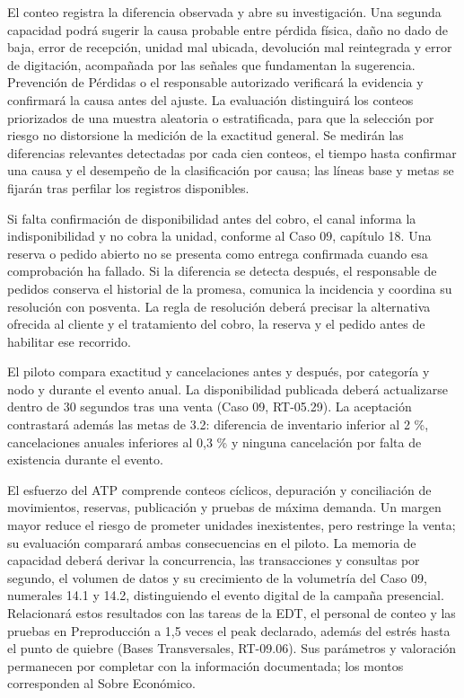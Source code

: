 \documentclass[11pt]{article}
\begin{document}
{El conteo registra la diferencia observada y abre su investigación. Una segunda capacidad podrá sugerir la causa probable entre pérdida física, daño no dado de baja, error de recepción, unidad mal ubicada, devolución mal reintegrada y error de digitación, acompañada por las señales que fundamentan la sugerencia. Prevención de Pérdidas o el responsable autorizado verificará la evidencia y confirmará la causa antes del ajuste. La evaluación distinguirá los conteos priorizados de una muestra aleatoria o estratificada, para que la selección por riesgo no distorsione la medición de la exactitud general. Se medirán las diferencias relevantes detectadas por cada cien conteos, el tiempo hasta confirmar una causa y el desempeño de la clasificación por causa; las líneas base y metas se fijarán tras perfilar los registros disponibles.}

{Si falta confirmación de disponibilidad antes del cobro, el canal informa la indisponibilidad y no cobra la unidad, conforme al Caso 09, capítulo 18. Una reserva o pedido abierto no se presenta como entrega confirmada cuando esa comprobación ha fallado. Si la diferencia se detecta después, el responsable de pedidos conserva el historial de la promesa, comunica la incidencia y coordina su resolución con posventa. La regla de resolución deberá precisar la alternativa ofrecida al cliente y el tratamiento del cobro, la reserva y el pedido antes de habilitar ese recorrido.}

{El piloto compara exactitud y cancelaciones antes y después, por categoría y nodo y durante el evento anual. La disponibilidad publicada deberá actualizarse dentro de 30 segundos tras una venta (Caso 09, RT-05.29). La aceptación contrastará además las metas de 3.2: diferencia de inventario inferior al 2 \%, cancelaciones anuales inferiores al 0,3 \% y ninguna cancelación por falta de existencia durante el evento.}

{El esfuerzo del ATP comprende conteos cíclicos, depuración y conciliación de movimientos, reservas, publicación y pruebas de máxima demanda. Un margen mayor reduce el riesgo de prometer unidades inexistentes, pero restringe la venta; su evaluación comparará ambas consecuencias en el piloto. La memoria de capacidad deberá derivar la concurrencia, las transacciones y consultas por segundo, el volumen de datos y su crecimiento de la volumetría del Caso 09, numerales 14.1 y 14.2, distinguiendo el evento digital de la campaña presencial. Relacionará estos resultados con las tareas de la EDT, el personal de conteo y las pruebas en Preproducción a 1,5 veces el peak declarado, además del estrés hasta el punto de quiebre (Bases Transversales, RT-09.06). Sus parámetros y valoración permanecen por completar con la información documentada; los montos corresponden al Sobre Económico.}
\end{document}
